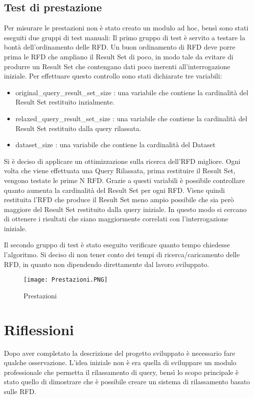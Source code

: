 \subsection{Test di prestazione}
Per misurare le prestazioni non è stato creato un modulo ad hoc, bensì sono stati eseguiti due gruppi di test manuali:
Il primo gruppo di test è servito a testare la bontà dell'ordinamento delle RFD. 
Un buon ordinamento di RFD deve porre prima le RFD che ampliano il Result Set di poco,
in modo tale da evitare di produrre un Result Set che contengano dati poco inerenti all'interrogazione iniziale.
Per effettuare questo controllo sono stati dichiarate tre variabili:
\begin{itemize}
    \item original{\_}query{\_}result{\_}set{\_}size : una variabile che contiene la cardinalità del Result Set restituito inzialmente.
    \item relaxed{\_}query{\_}result{\_}set{\_}size : una variabile che contiene la cardinalità del Result Set restituito dalla query rilassata.
    \item dataset{\_}size : una variabile che contiene la cardinalità del Dataset
\end{itemize}



Si è deciso di applicare un ottimizzazione sulla ricerca dell'RFD migliore. 
Ogni volta che viene effettuata una Query Rilassata, prima restituire il Result Set, vengono testate le prime N RFD.
Grazie a questi variabili è possibile controllare quanto aumenta la cardinalità del Result Set per ogni RFD. Viene quindi restituita l'RFD che produce il Result Set meno ampio possibile che sia però maggiore del Result Set restituito dalla query iniziale. In questo modo si cercano di ottenere i risultati che siano maggiormente correlati con l'interrogazione iniziale.

Il secondo gruppo di test è stato eseguito verificare quanto tempo chiedesse l'algoritmo.
Si deciso di non tener conto dei tempi di ricerca/caricamento delle RFD, in quanto non dipendendo direttamente dal lavoro sviluppato.

\begin{figure}
    \centering
    \texttt{[image: Prestazioni.PNG]}
    \caption{Prestazioni}
    \label{fig:prestazioni}
\end{figure}

\section{Riflessioni}
Dopo aver completato la descrizione del progetto sviluppato è necessario fare qualche osservazione.
L'idea iniziale non è era quella di sviluppare un modulo professionale che permetta il rilassamento di query, bensì lo scopo principale è stato quello di dimostrare che è possibile creare un sistema di rilassamento basato sulle RFD.


